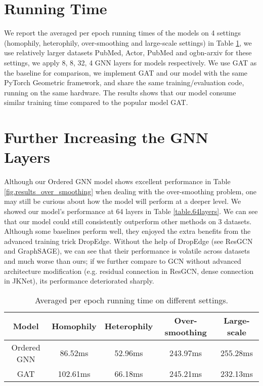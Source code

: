 \documentclass{article}
\begin{document}
\section{Running Time}

We report the averaged per epoch running times of the models on 4 settings (homophily, heterophily, over-smoothing and large-scale settings) in Table \ref{table.runtime}, we use relatively larger datasets PubMed, Actor, PubMed and ogbn-arxiv for these settings, we apply 8, 8, 32, 4 GNN layers for models respectively. We use GAT as the baseline for comparison, we implement GAT and our model with the same PyTorch Geometric framework, and share the same training/evaluation code, running on the same hardware. The results shows that our model consume similar training time compared to the popular model GAT.

\section{Further Increasing the GNN Layers}
Although our Ordered GNN model shows excellent performance in Table \ref{fig.results_over_smoothing} when dealing with the over-smoothing problem, one may still be curious about how the model will perform at a deeper level. We showed our model's performance at 64 layers in Table \ref{table.64layers}. We can see that our model could still consistently outperform other methods on 3 datasets. Although some baselines perform well, they enjoyed the extra benefits from the advanced training trick DropEdge. Without the help of DropEdge (see ResGCN and GraphSAGE), we can see that their performance is volatile across datasets and much worse than ours; if we further compare to GCN without advanced architecture modification (e.g. residual connection in ResGCN, dense connection in JKNet), its performance deteriorated sharply.

\begin{table}
\caption{Averaged per epoch running time on different settings.}
\label{table.runtime}
\centering
\begin{tabular}{c|cccc}

\toprule
Model & Homophily & Heterophily & Over-smoothing & Large-scale \\
\midrule
Ordered GNN  & 86.52ms  & 52.96ms  & 243.97ms  & 255.28ms  \\
GAT & 102.61ms  & 66.18ms  & 245.21ms  & 232.13ms  \\
\bottomrule

\end{tabular}
\end{table}
\end{document}
